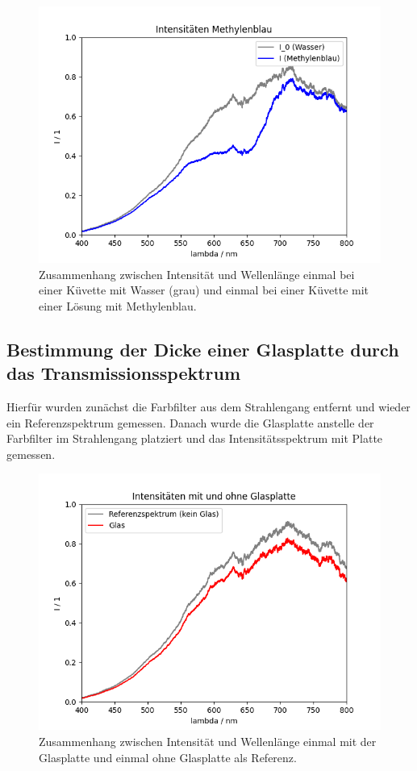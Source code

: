 \documentclass{article}
\begin{document}
\begin{figure}[H]
\centering
\caption{Zusammenhang zwischen Intensität und Wellenlänge einmal bei einer Küvette mit Wasser (grau) und einmal bei einer Küvette mit einer Lösung mit Methylenblau.}
\label{fig:I_methyl}
\includegraphics[scale=0.7]{Intensitaeten_Methyl.png}
\end{figure}





\subsection{Bestimmung der Dicke einer Glasplatte durch das Transmissionsspektrum}

Hierfür wurden zunächst die Farbfilter aus dem Strahlengang entfernt und wieder ein Referenzspektrum gemessen. Danach wurde die Glasplatte anstelle der Farbfilter im Strahlengang platziert und das Intensitätsspektrum mit Platte gemessen.



\begin{figure}[H]
\centering
\caption{Zusammenhang zwischen Intensität und Wellenlänge einmal mit der Glasplatte und einmal ohne Glasplatte als Referenz.}
\label{fig:I_glas}
\includegraphics[scale=0.7]{Glas_Intensitaeten.png}
\end{figure}
\end{document}
